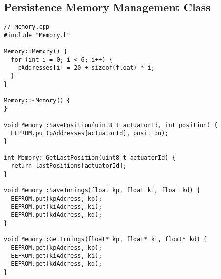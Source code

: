 \subsection{Persistence Memory Management Class}
\begin{verbatim}
// Memory.cpp
#include "Memory.h"

Memory::Memory() {
  for (int i = 0; i < 6; i++) {
    pAddresses[i] = 20 + sizeof(float) * i;
  }
}

Memory::~Memory() {
}

void Memory::SavePosition(uint8_t actuatorId, int position) {
  EEPROM.put(pAddresses[actuatorId], position);
}

int Memory::GetLastPosition(uint8_t actuatorId) {
  return lastPositions[actuatorId];
}

void Memory::SaveTunings(float kp, float ki, float kd) {
  EEPROM.put(kpAddress, kp);
  EEPROM.put(kiAddress, ki);
  EEPROM.put(kdAddress, kd);
}

void Memory::GetTunings(float* kp, float* ki, float* kd) {
  EEPROM.get(kpAddress, kp);
  EEPROM.get(kiAddress, ki);
  EEPROM.get(kdAddress, kd);
}
\end{verbatim}

